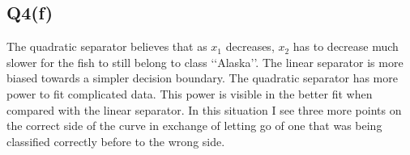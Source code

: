 \documentclass[11pt]{article}
\begin{document}
\subsection{Q4(f)}
\label{sec:org2efb49c}
The quadratic separator believes that as \(x_1\) decreases, \(x_2\)
has to decrease much slower for the fish to still belong to class
\lq\lq Alaska\rq\rq. The linear separator is more biased towards a
simpler decision boundary. The quadratic separator has more power
to fit complicated data. This power is visible in the better fit when
compared with the linear separator. In this situation I see three more
points on the correct side of the curve in exchange of letting go of
one that was being classified correctly before to the wrong side.
\end{document}
